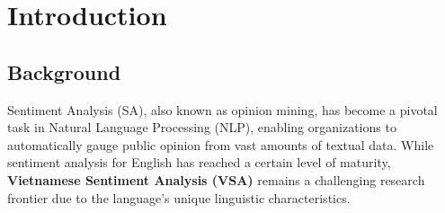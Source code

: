 \documentclass[12pt]{report} %
\begin{document}
\listoftables

\listoffigures

\cleardoublepage
{}

\chapter{Introduction}

\section{Background}

Sentiment Analysis (SA), also known as opinion mining, has become a pivotal task in Natural Language Processing (NLP), enabling organizations to automatically gauge public opinion from vast amounts of textual data. While sentiment analysis for English has reached a certain level of maturity, \textbf{Vietnamese Sentiment Analysis (VSA)} remains a challenging research frontier due to the language's unique linguistic characteristics.
\end{document}
